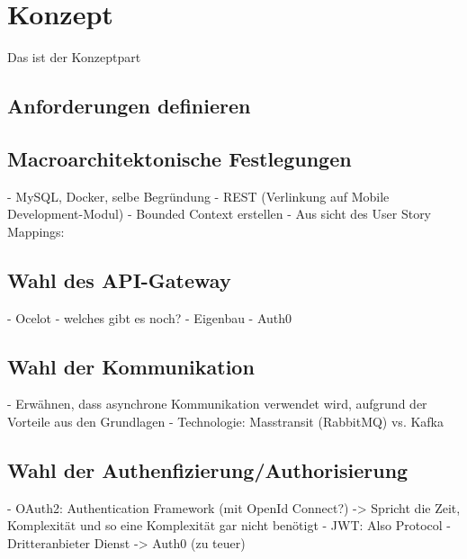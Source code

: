 \section{Konzept}
Das ist der Konzeptpart

\subsection{Anforderungen definieren}

\subsection{Macroarchitektonische Festlegungen}
- MySQL, Docker, selbe Begründung
- REST (Verlinkung auf Mobile Development-Modul)
- Bounded Context erstellen
- Aus sicht des User Story Mappings: 

\subsection{Wahl des API-Gateway}
- Ocelot 
- welches gibt es noch? 
- Eigenbau 
- Auth0


\subsection{Wahl der Kommunikation}
- Erwähnen, dass asynchrone Kommunikation verwendet wird, aufgrund der Vorteile aus den Grundlagen 
- Technologie: Masstransit (RabbitMQ) vs. Kafka

\subsection{Wahl der Authenfizierung/Authorisierung}
- OAuth2: Authentication Framework (mit OpenId Connect?) -> Spricht die Zeit, Komplexität und so eine Komplexität gar nicht benötigt 
- JWT: Also Protocol
- Dritteranbieter Dienst -> Auth0 (zu teuer)

